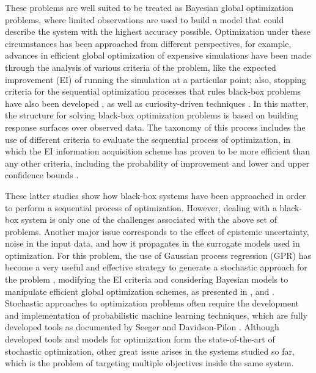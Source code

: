 \documentclass{article}
\begin{document}
These problems are well suited to be treated as Bayesian global optimization problems, where limited observations are used to build a model that could describe the system with the highest accuracy possible. Optimization under these circumstances has been approached from different perspectives, for example, advances in efficient global optimization of expensive simulations have been made through the analysis of various criteria of the problem, like the expected improvement (EI) of running the simulation at a particular point; also, stopping criteria for the sequential optimization processes that rules black-box problems have also been developed \cite{Jones1998}, as well as curiosity-driven techniques \cite{Schaul2011}. In this matter, the structure for solving black-box optimization problems is based on building response surfaces over observed data. The taxonomy of this process includes the use of different criteria to evaluate the sequential process of optimization, in which the EI information acquisition scheme has proven to be more efficient than any other criteria, including the probability of improvement and lower and upper confidence bounds \cite{Jones2001}.

These latter studies show how black-box systems have been approached in order to perform a sequential process of optimization. However, dealing with a black-box system is only one of the challenges associated with the above set of problems. Another major issue corresponds to the effect of epistemic uncertainty, noise in the input data, and how it propagates in the surrogate models used in optimization. For this problem, the use of Gaussian process regression (GPR) has become a very useful and effective strategy to generate a stochastic approach for the problem \cite{Wang2016}, modifying the EI criteria and considering Bayesian models to manipulate efficient global optimization schemes, as presented in \cite{Huang2006}, \cite{Pandita2016} and \cite{Li2014}. Stochastic approaches to optimization problems often require the development and implementation of probabilistic machine learning techniques, which are fully developed tools as documented by Seeger \cite{Seeger2004} and Davidson-Pilon \cite{Davidson-Pilon2014}. Although developed tools and models for optimization form the state-of-the-art of stochastic optimization, other great issue arises in the systems studied so far, which is the problem of targeting multiple objectives inside the same system.
\end{document}
